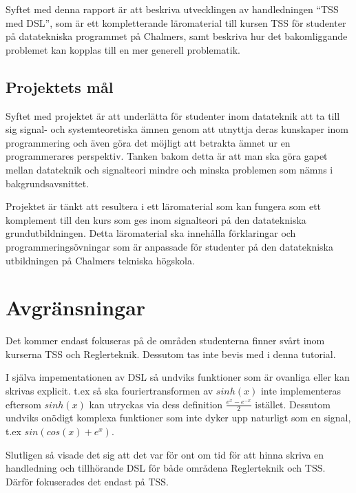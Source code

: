 \documentclass[]{article}
\begin{document}


Syftet med denna rapport är att beskriva utvecklingen av handledningen “TSS med DSL”, som är ett kompletterande läromaterial till kursen TSS för studenter på datatekniska programmet på Chalmers, samt beskriva hur det bakomliggande problemet kan kopplas till en mer generell problematik.

\subsection{Projektets mål}
Syftet med projektet är att underlätta för studenter inom datateknik att ta till sig signal- och systemteoretiska ämnen genom att utnyttja deras kunskaper inom programmering och även göra det möjligt att betrakta ämnet ur en programmerares perspektiv. Tanken bakom detta är att man ska göra gapet mellan datateknik och signalteori mindre och minska problemen som nämns i bakgrundsavsnittet.

Projektet är tänkt att resultera i ett läromaterial som kan fungera som ett komplement till den kurs som ges inom signalteori på den datatekniska grundutbildningen. Detta läromaterial ska innehålla förklaringar och programmeringsövningar som är anpassade för studenter på den datatekniska utbildningen på Chalmers tekniska högskola.

\section{Avgränsningar}

%

Det kommer endast fokuseras på de områden studenterna finner svårt inom
kurserna TSS och Reglerteknik. Dessutom tas inte bevis med i denna tutorial.

I själva impementationen av DSL så undviks funktioner som är
ovanliga eller kan skrivas explicit. t.ex så ska fouriertransformen av
$sinh(x)$ inte implementeras eftersom $sinh(x)$ kan utryckas via dess
definition $\frac{e^{x} - e^{-x}}{2}$ istället.
Dessutom undviks onödigt komplexa funktioner som inte
dyker upp naturligt som en signal, t.ex $sin(cos(x)+e^x)$.

Slutligen så visade det sig att det var för ont om tid för att hinna
skriva en handledning och tillhörande DSL för både områdena Reglerteknik och TSS.
Därför fokuserades det endast på TSS.
\end{document}
